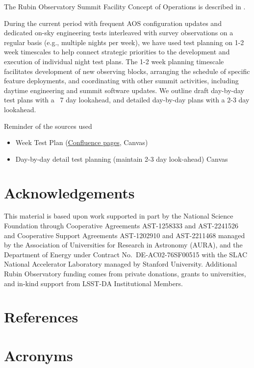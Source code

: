 \documentclass[SO,lsst,authoryear,toc]{lsstdoc}
\begin{document}
The Rubin Observatory Summit Facility Concept of Operations is described in \citep{RTN-094}.

During the current period with frequent AOS configuration updates and dedicated on-sky engineering tests interleaved with survey observations on a regular basis (e.g., multiple nights per week), we have used test planning on 1-2 week timescales to help connect strategic priorities to the development and execution of individual night test plans. The 1-2 week planning timescale facilitates development of new observing blocks, arranging the schedule of specific feature deployments, and coordinating with other summit activities, including daytime engineering and summit software updates. We outline draft day-by-day test plans with a ~7 day lookahead, and detailed day-by-day plans with a 2-3 day lookahead.

Reminder of the sources used
\begin{itemize}
  \item Week Test Plan (\href{https://rubinobs.atlassian.net/wiki/spaces/LSSTCOM/pages/68255748/Week+Test+Plan+Meeting+Notes}{Confluence pages}, Canvas)
  \item Day-by-day detail test planning (maintain 2-3 day look-ahead) Canvas
\end{itemize}


\appendix

\section{Acknowledgements}

This material is based upon work supported in part by the National Science Foundation through Cooperative Agreements AST-1258333 and AST-2241526 and Cooperative Support Agreements AST-1202910 and AST-2211468 managed by the Association of Universities for Research in Astronomy (AURA), and the Department of Energy under Contract No.\ DE-AC02-76SF00515 with the SLAC National Accelerator Laboratory managed by Stanford University.
Additional Rubin Observatory funding comes from private donations, grants to universities, and in-kind support from LSST-DA Institutional Members.

\section{References} \label{sec:bib}
\renewcommand{\refname}{} %


\section{Acronyms} \label{sec:acronyms}

\end{document}
